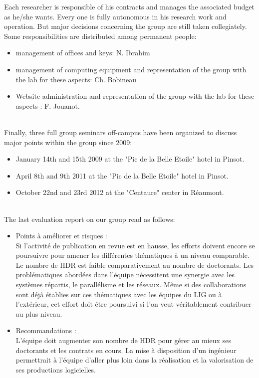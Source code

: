 Each researcher is responsible of his contracts and manages the associated budget as he/she wants. Every one is fully autonomous in his research work and operation. But major decisions concerning the group are still taken collegiately. Some responsibilities are distributed among permanent people:
\begin{itemize}
\setlength{\itemsep}{-0.1cm}
\item management of offices and keys: N. Ibrahim
\item management of computing equipment and representation of the group with the lab for these aspects: Ch. Bobineau
\item Website administration and representation of the group with the lab for these aspects : F. Jouanot.
\end{itemize}
~\\
\noindent Finally, three full group seminars off-campus have been organized to discuss major points within the group since 2009:
\begin{itemize}
\setlength{\itemsep}{-0.1cm}
\item January 14th and 15th 2009 at the "Pic de la Belle Etoile" hotel in Pinsot.
\item April 8th and 9th 2011 at the "Pic de la Belle Etoile" hotel in Pinsot.
\item October 22nd and 23rd 2012 at the "Centaure" center in Réaumont.
\end{itemize}
~\\
\noindent The last evaluation report on our group read as follows: 
\begin{it}
\begin{itemize}
\setlength{\itemsep}{-0.4cm}
\item Points {\`a} am{\'e}liorer et risques :\\
Si l'activit{\'e}  de publication en revue est en hausse, les efforts doivent encore se poursuivre pour amener les diff{\'e}rentes th{\'e}matiques {\`a} un niveau comparable. Le nombre de HDR est faible comparativement au nombre de doctorants.
Les probl{\'e}matiques abord{\'e}es dans l'{\'e}quipe n{\'e}cessitent une synergie avec les syst{\`e}mes r{\'e}partis, le parall{\'e}lisme et les r{\'e}seaux. M{\^e}me si des collaborations sont d{\'e}j{\`a}  {\'e}tablies sur ces th{\'e}matiques avec les {\'e}quipes du LIG ou {\`a} l'ext{\'e}rieur, cet effort doit {\^e}tre poursuivi si l'on veut v{\'e}ritablement contribuer au plus niveau.\\
\item Recommandations :\\
L'{\'e}quipe doit augmenter son nombre de HDR pour g{\'e}rer au mieux ses doctorants et les contrats en cours. La mise {\`a} disposition d'un ing{\'e}nieur permettrait {\`a} l'{\'e}quipe d'aller plus loin dans la r{\'e}alisation et la valorisation de ses productions logicielles.
\end{itemize}
\end{it}

